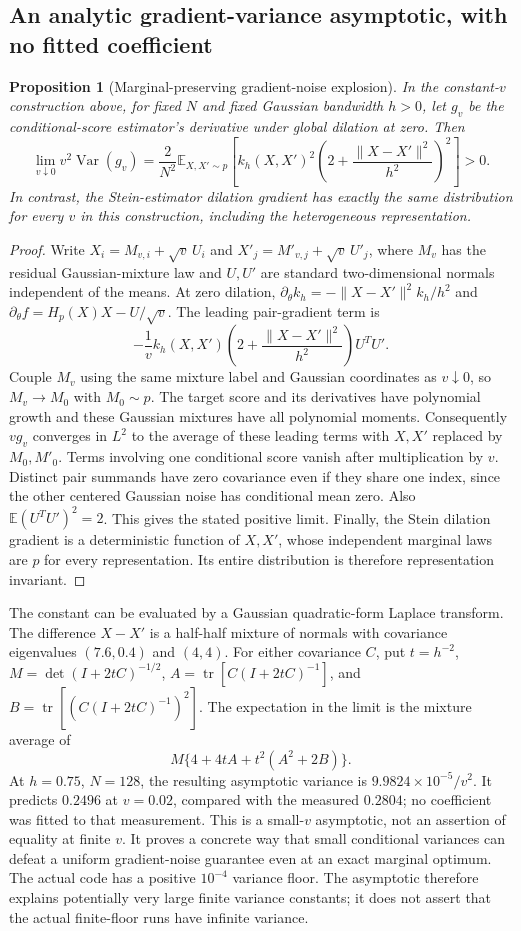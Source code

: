 \documentclass[11pt,a4paper]{article}
\newtheorem{proposition}{Proposition}[section]
\numberwithin{equation}{section}
\newcommand{\E}{\mathbb E}
\newcommand{\Var}{\operatorname{Var}}
\newcommand{\tr}{\operatorname{tr}}
\begin{document}
\subsection{An analytic gradient-variance asymptotic, with no fitted coefficient}
\begin{proposition}[Marginal-preserving gradient-noise explosion]
In the constant-$v$ construction above, for fixed $N$ and fixed Gaussian
bandwidth $h>0$, let $g_v$ be the conditional-score estimator's derivative
under global dilation at zero. Then
\[
 \lim_{v\downarrow0}v^2\Var(g_v)
 =\frac{2}{N^2}\E_{X,X'\sim p}
   \left[k_h(X,X')^2\left(2+\frac{\|X-X'\|^2}{h^2}\right)^2\right]>0.
\]
In contrast, the Stein-estimator dilation gradient has exactly the same
distribution for every $v$ in this construction, including the heterogeneous
representation.
\end{proposition}
\begin{proof}
Write $X_i=M_{v,i}+\sqrt v\,U_i$ and $X'_j=M'_{v,j}+\sqrt v\,U'_j$,
where $M_v$ has the residual Gaussian-mixture law and $U,U'$ are standard
two-dimensional normals independent of the means. At zero dilation,
$\partial_\theta k_h=-\|X-X'\|^2k_h/h^2$ and
$\partial_\theta f=H_p(X)X-U/\sqrt v$. The leading pair-gradient term is
\[
 -\frac1v k_h(X,X')\left(2+\frac{\|X-X'\|^2}{h^2}\right)U^TU'.
\]
Couple $M_v$ using the same mixture label and Gaussian coordinates as
$v\downarrow0$, so $M_v\to M_0$ with $M_0\sim p$. The target score and its
derivatives have polynomial growth and these Gaussian mixtures have all
polynomial moments. Consequently $v g_v$ converges in $L^2$ to the average
of these leading terms with $X,X'$ replaced by $M_0,M'_0$. Terms involving
one conditional score vanish after multiplication by $v$. Distinct pair
summands have zero covariance even if they share one index, since the
other centered Gaussian noise has conditional mean zero. Also
$\E(U^TU')^2=2$. This gives the stated positive limit. Finally, the Stein
dilation gradient is a deterministic function of $X,X'$, whose independent
marginal laws are $p$ for every representation. Its entire distribution is
therefore representation invariant.
\end{proof}
The constant can be evaluated by a Gaussian quadratic-form Laplace transform.
The difference $X-X'$ is a half-half mixture of normals with covariance
eigenvalues $(7.6,0.4)$ and $(4,4)$. For either covariance $C$, put
$t=h^{-2}$, $M=\det(I+2tC)^{-1/2}$,
$A=\tr[C(I+2tC)^{-1}]$, and
$B=\tr[(C(I+2tC)^{-1})^2]$. The expectation in the limit is the mixture
average of
\[
 M\{4+4tA+t^2(A^2+2B)\}.
\]
At $h=0.75$, $N=128$, the resulting asymptotic variance is
$9.9824\times10^{-5}/v^2$. It predicts $0.2496$ at $v=0.02$, compared with
the measured $0.2804$; no coefficient was fitted to that measurement. This
is a small-$v$ asymptotic, not an assertion of equality at finite $v$. It
proves a concrete way that small conditional variances can defeat a
uniform gradient-noise guarantee even at an exact marginal optimum.
The actual code has a positive $10^{-4}$ variance floor. The asymptotic
therefore explains potentially very large finite variance constants; it does
not assert that the actual finite-floor runs have infinite variance.
\end{document}
